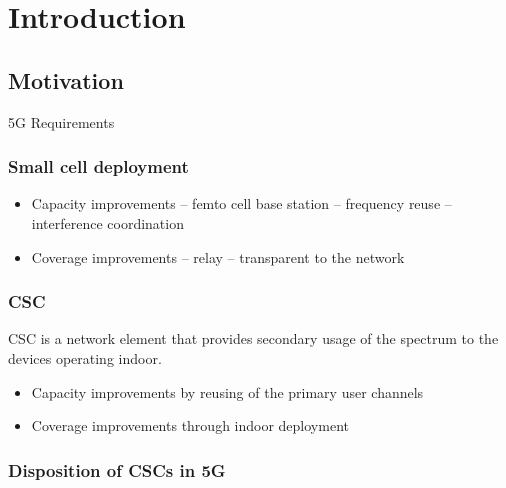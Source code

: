 \chapter{Introduction}

\section{Motivation}
\label{sec:mot}

5G Requirements


\subsection{Small cell deployment}
\begin{itemize}
\item Capacity improvements -- femto cell base station -- frequency reuse -- interference coordination
\item Coverage improvements -- relay -- transparent to the network
\end{itemize}

\subsection{\ac{CSC}}
CSC is a network element that provides secondary usage of the spectrum to the devices operating indoor.
\begin{itemize}
\item Capacity improvements by reusing of the primary user channels
\item Coverage improvements through indoor deployment
\end{itemize}

\subsection{Disposition of CSCs in 5G}



